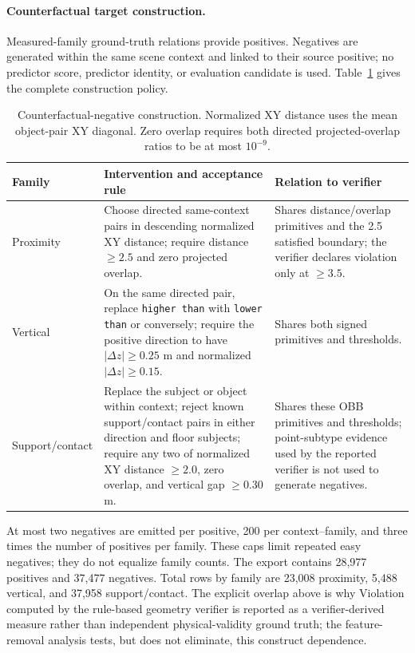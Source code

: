 \paragraph{Counterfactual target construction.}
Measured-family ground-truth relations provide positives. Negatives are generated
within the same scene context and linked to their source positive; no predictor
score, predictor identity, or evaluation candidate is used.
Table~\ref{tab:counterfactual-rules} gives the complete construction policy.

\begin{table}[t]
\centering
{\small
\setlength{\tabcolsep}{2.5pt}
\begin{tabular}{p{.20\linewidth}p{.45\linewidth}p{.27\linewidth}}
\toprule
Family & Intervention and acceptance rule & Relation to verifier \\
\midrule
Proximity & Choose directed same-context pairs in descending normalized XY
distance; require distance $\geq2.5$ and zero projected overlap. & Shares
distance/overlap primitives and the 2.5 satisfied boundary; the verifier
declares violation only at $\geq3.5$. \\
Vertical & On the same directed pair, replace \texttt{higher than} with
\texttt{lower than} or conversely; require the positive direction to have
$|\Delta z|\geq0.25$ m and normalized $|\Delta z|\geq0.15$. & Shares both
signed primitives and thresholds. \\
Support/\allowbreak contact & Replace the subject or object within context; reject known
support/contact pairs in either direction and floor subjects; require any two
of normalized XY distance $\geq2.0$, zero overlap, and vertical gap
$\geq0.30$ m. & Shares these OBB primitives and thresholds; point-subtype
evidence used by the reported verifier is not used to generate negatives. \\
\bottomrule
\end{tabular}
}
\caption{Counterfactual-negative construction. Normalized XY distance uses the
mean object-pair XY diagonal. Zero overlap requires both directed
projected-overlap ratios to be at most $10^{-9}$.}
\label{tab:counterfactual-rules}
\end{table}

At most two negatives are emitted per positive, 200 per context--family, and
three times the number of positives per family. These caps limit repeated easy
negatives; they do not equalize family counts. The export contains 28,977
positives and 37,477 negatives. Total rows by family are 23,008 proximity,
5,488 vertical, and 37,958 support/contact. The explicit overlap above is why
Violation computed by the rule-based geometry verifier is reported as a
verifier-derived measure rather than independent physical-validity ground truth;
the feature-removal analysis tests, but does not eliminate, this construct
dependence.

